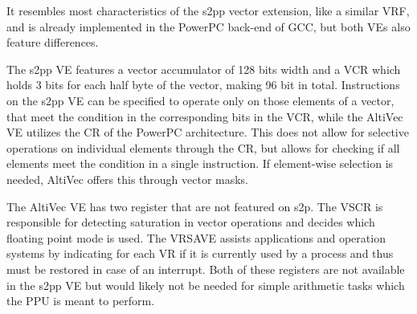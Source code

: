 {It resembles most characteristics of the \ac{s2pp} vector extension, like a similar VRF, and is already implemented in the PowerPC back-end of \ac{GCC}, but both \ac{VE}s also feature differences.

The \ac{s2pp} \ac{VE} features a vector accumulator of 128 bits width and a \ac{VCR} which holds 3 bits for each half byte of the vector, making 96 bit in total.
Instructions on the \ac{s2pp} \ac{VE} can be specified to operate only on those elements of a vector, that meet the condition in the corresponding bits in the \ac{VCR}, while the AltiVec \ac{VE} utilizes the \ac{CR} of the PowerPC architecture.
This does not allow for selective operations on individual elements through the \ac{CR}, but allows for checking if all elements meet the condition in a single instruction.
If element-wise selection is needed, AltiVec offers this through vector masks.
    
The AltiVec \ac{VE} has two register that are not featured on s2p.
The \ac{VSCR} is responsible for detecting saturation in vector operations and decides which floating point mode is used.
The \ac{VRSAVE} assists applications and operation systems by indicating for each \ac{VR} if it is currently used by a process and thus must be restored in case of an interrupt.
Both of these registers are not available in the \ac{s2pp} \ac{VE} but would likely not be needed for simple arithmetic tasks which the \ac{PPU} is meant to perform.

}
